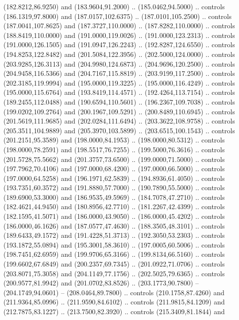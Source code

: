   (182.8212,86.9250) and (183.9604,91.2000) .. (185.0462,94.5000) .. controls
  (186.1319,97.8000) and (187.0157,102.6375) .. (187.0101,105.2500) .. controls
  (187.0041,107.8625) and (187.3727,110.0000) .. (187.8282,110.0000) .. controls
  (188.8419,110.0000) and (191.0000,119.0026) .. (191.0000,123.2313) .. controls
  (191.0000,126.1505) and (191.0947,126.2243) .. (192.8287,124.6550) .. controls
  (194.8253,122.8482) and (201.5084,122.3956) .. (202.5000,124.0000) .. controls
  (203.9285,126.3113) and (204.9980,124.6873) .. (204.9696,120.2500) .. controls
  (204.9458,116.5366) and (204.7167,115.8819) .. (203.9199,117.2500) .. controls
  (202.3185,119.9994) and (195.0000,119.3225) .. (195.0000,116.4249) .. controls
  (195.0000,115.6764) and (193.8419,114.4571) .. (192.4264,113.7154) .. controls
  (189.2455,112.0488) and (190.6594,110.5601) .. (196.2367,109.7038) .. controls
  (199.0202,109.2764) and (200.1967,109.5291) .. (200.8489,110.6945) .. controls
  (201.5619,111.9685) and (202.0284,111.6494) .. (203.3622,108.9758) .. controls
  (205.3511,104.9889) and (205.3970,103.5899) .. (203.6515,100.1543) .. controls
  (201.2151,95.3589) and (198.0000,84.1953) .. (198.0000,80.5312) .. controls
  (198.0000,78.2591) and (198.5517,76.7255) .. (199.5000,76.3616) .. controls
  (201.5728,75.5662) and (201.3757,73.6500) .. (199.0000,71.5000) .. controls
  (197.7962,70.4106) and (197.0000,68.4200) .. (197.0000,66.5000) .. controls
  (197.0000,64.5258) and (196.1971,62.5839) .. (194.8936,61.4050) .. controls
  (193.7351,60.3572) and (191.8880,57.7000) .. (190.7890,55.5000) .. controls
  (189.6900,53.3000) and (186.9535,49.5969) .. (184.7078,47.2710) .. controls
  (182.4621,44.9450) and (180.8956,42.7710) .. (181.2267,42.4399) .. controls
  (182.1595,41.5071) and (186.0000,43.9050) .. (186.0000,45.4202) .. controls
  (186.0000,46.1626) and (187.0577,47.4630) .. (188.3505,48.3101) .. controls
  (189.6433,49.1572) and (191.4228,51.3713) .. (192.3050,53.2303) .. controls
  (193.1872,55.0894) and (195.3001,58.3610) .. (197.0005,60.5006) .. controls
  (198.7451,62.6959) and (199.9706,65.3166) .. (199.8134,66.5160) .. controls
  (199.6602,67.6849) and (200.2357,69.7345) .. (201.0922,71.0706) .. controls
  (203.8071,75.3058) and (204.1149,77.1756) .. (202.5025,79.6365) .. controls
  (200.9577,81.9942) and (201.0702,83.8526) .. (203.1773,90.7800) --
  (204.1749,94.0601) -- (208.0464,89.7800) .. controls (210.1758,87.4260) and
  (211.9364,85.0996) .. (211.9590,84.6102) .. controls (211.9815,84.1209) and
  (212.7875,83.1227) .. (213.7500,82.3920) .. controls (215.3409,81.1844) and
